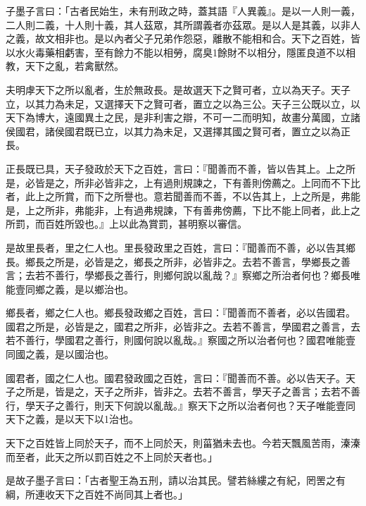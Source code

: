 
\begin{pinyinscope}
子墨子言曰：「古者民始生，未有刑政之時，蓋其語『人異義』。是以一人則一義，二人則二義，十人則十義，其人茲眾，其所謂義者亦茲眾。是以人是其義，以非人之義，故文相非也。是以內者父子兄弟作怨惡，離散不能相和合。天下之百姓，皆以水火毒藥相虧害，至有餘力不能以相勞，腐臭1餘財不以相分，隱匿良道不以相教，天下之亂，若禽獸然。

夫明虖天下之所以亂者，生於無政長。是故選天下之賢可者，立以為天子。天子立，以其力為未足，又選擇天下之賢可者，置立之以為三公。天子三公既以立，以天下為博大，遠國異土之民，是非利害之辯，不可一二而明知，故畫分萬國，立諸侯國君，諸侯國君既已立，以其力為未足，又選擇其國之賢可者，置立之以為正長。

正長既已具，天子發政於天下之百姓，言曰：『聞善而不善，皆以告其上。上之所是，必皆是之，所非必皆非之，上有過則規諫之，下有善則傍薦之。上同而不下比者，此上之所賞，而下之所譽也。意若聞善而不善，不以告其上，上之所是，弗能是，上之所非，弗能非，上有過弗規諫，下有善弗傍薦，下比不能上同者，此上之所罰，而百姓所毀也。』上以此為賞罰，甚明察以審信。

是故里長者，里之仁人也。里長發政里之百姓，言曰：『聞善而不善，必以告其鄉長。鄉長之所是，必皆是之，鄉長之所非，必皆非之。去若不善言，學鄉長之善言；去若不善行，學鄉長之善行，則鄉何說以亂哉？』察鄉之所治者何也？鄉長唯能壹同鄉之義，是以鄉治也。

鄉長者，鄉之仁人也。鄉長發政鄉之百姓，言曰：『聞善而不善者，必以告國君。國君之所是，必皆是之，國君之所非，必皆非之。去若不善言，學國君之善言，去若不善行，學國君之善行，則國何說以亂哉。』察國之所以治者何也？國君唯能壹同國之義，是以國治也。

國君者，國之仁人也。國君發政國之百姓，言曰：『聞善而不善。必以告天子。天子之所是，皆是之，天子之所非，皆非之。去若不善言，學天子之善言；去若不善行，學天子之善行，則天下何說以亂哉。』察天下之所以治者何也？天子唯能壹同天下之義，是以天下以1治也。

天下之百姓皆上同於天子，而不上同於天，則菑猶未去也。今若天飄風苦雨，溱溱而至者，此天之所以罰百姓之不上同於天者也。」

是故子墨子言曰：「古者聖王為五刑，請以治其民。譬若絲縷之有紀，罔罟之有綱，所連收天下之百姓不尚同其上者也。」


\end{pinyinscope}